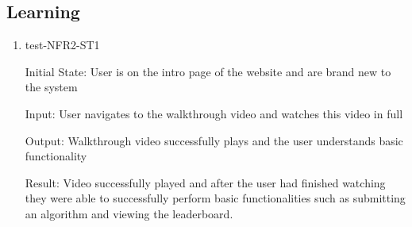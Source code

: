 \documentclass[12pt, titlepage]{article}
\begin{document}
\subsection{Learning}
\begin{enumerate}

\item{test-NFR2-ST1} \label{test-NFR2-ST1}

Initial State: User is on the intro page of the website and are brand new to the system

Input: User navigates to the walkthrough video and watches this video in full

Output: Walkthrough video successfully plays and the user understands basic functionality

Result: Video successfully played and after the user had finished watching they were able to successfully perform basic functionalities such as submitting an algorithm and viewing the leaderboard. 
\end{enumerate}
\end{document}
